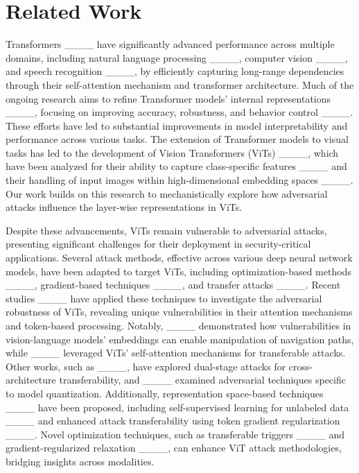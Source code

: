 \section{Related Work}
Transformers ____ have significantly advanced performance across multiple domains, including natural language processing ____, computer vision ____, and speech recognition ____, by efficiently capturing long-range dependencies through their self-attention mechanism and transformer architecture. Much of the ongoing research aims to refine Transformer models' internal representations ____, focusing on improving accuracy, robustness, and behavior control ____. These efforts have led to substantial improvements in model interpretability and performance across various tasks. The extension of Transformer models to visual tasks has led to the development of Vision Transformers (ViTs) ____, which have been analyzed for their ability to capture class-specific features ____ and their handling of input images within high-dimensional embedding spaces ____. Our work builds on this research to mechanistically explore how adversarial attacks influence the layer-wise representations in ViTs.

Despite these advancements, ViTs remain vulnerable to adversarial attacks, presenting significant challenges for their deployment in security-critical applications. Several attack methods, effective across various deep neural network models, have been adapted to target ViTs, including optimization-based methods ____, gradient-based techniques ____, and transfer attacks ____. Recent studies ____ have applied these techniques to investigate the adversarial robustness of ViTs, revealing unique vulnerabilities in their attention mechanisms and token-based processing. Notably, ____ demonstrated how vulnerabilities in vision-language models' embeddings can enable manipulation of navigation paths, while ____ leveraged ViTs' self-attention mechanisms for transferable attacks. Other works, such as ____, have explored dual-stage attacks for cross-architecture transferability, and ____ examined adversarial techniques specific to model quantization. Additionally, representation space-based techniques ____ have been proposed, including self-supervised learning for unlabeled data ____ and enhanced attack transferability using token gradient regularization ____. Novel optimization techniques, such as transferable triggers ____ and gradient-regularized relaxation ____, can enhance ViT attack methodologies, bridging insights across modalities.


